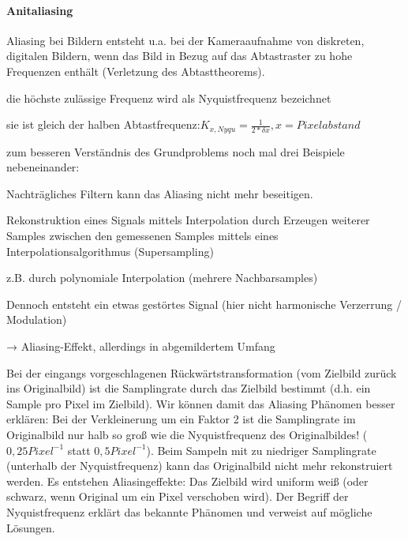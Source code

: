 \documentclass[landscape]{article}
\begin{document}
\begin{multicols}{3}
  \paragraph{Anitaliasing}
  \begin{itemize*}
    \item Aliasing bei Bildern entsteht u.a. bei der Kameraaufnahme von diskreten, digitalen Bildern, wenn das Bild in Bezug auf das Abtastraster zu hohe Frequenzen enthält (Verletzung des Abtasttheorems).
    \item die höchste zulässige Frequenz wird als Nyquistfrequenz bezeichnet
    \begin{itemize*}
      \item sie ist gleich der halben Abtastfrequenz:$K_{x,Nyqu}=\frac{1}{2*\delta x}, x = Pixelabstand$
      \item zum besseren Verständnis des Grundproblems noch mal drei Beispiele nebeneinander:
      \item Nachträgliches Filtern kann das Aliasing nicht mehr beseitigen.
    \end{itemize*}
    \item Rekonstruktion eines Signals mittels Interpolation durch Erzeugen weiterer Samples zwischen den gemessenen Samples mittels eines Interpolationsalgorithmus (Supersampling)
    \item z.B. durch polynomiale Interpolation (mehrere Nachbarsamples)
    \item Dennoch entsteht ein etwas gestörtes Signal (hier nicht harmonische Verzerrung / Modulation)
    \item → Aliasing-Effekt, allerdings in abgemildertem Umfang
  \end{itemize*}
  
  Bei der eingangs vorgeschlagenen Rückwärtstransformation (vom Zielbild zurück ins Originalbild) ist die Samplingrate durch das Zielbild bestimmt (d.h. ein Sample pro Pixel im Zielbild). 
  Wir können damit das Aliasing Phänomen besser erklären: Bei der Verkleinerung um ein Faktor 2 ist die Samplingrate im Originalbild nur halb so groß wie die
  Nyquistfrequenz des Originalbildes! ($0,25 Pixel^{-1}$ statt $0,5 Pixel^{-1}$).
  Beim Sampeln mit zu niedriger Samplingrate (unterhalb der Nyquistfrequenz) kann das Originalbild nicht mehr rekonstruiert werden. Es entstehen Aliasingeffekte: Das Zielbild wird  uniform weiß (oder schwarz, wenn Original um ein Pixel verschoben wird).
  Der Begriff der Nyquistfrequenz erklärt das bekannte Phänomen und verweist auf mögliche Lösungen.
  

\end{multicols}
\end{document}
